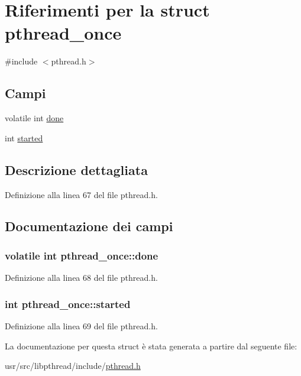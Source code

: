 \hypertarget{structpthread__once}{\section{Riferimenti per la struct pthread\+\_\+once}
\label{structpthread__once}
}


{\ttfamily \#include $<$pthread.\+h$>$}

\subsection*{Campi}
\begin{DoxyCompactItemize}
\item 
volatile int \hyperlink{structpthread__once_acffdc3852414e4eeece3c8e7cf80ffc1}{done}
\item 
int \hyperlink{structpthread__once_a2bebfebb49a5c75d10119824d5bba93c}{started}
\end{DoxyCompactItemize}


\subsection{Descrizione dettagliata}


Definizione alla linea 67 del file pthread.\+h.



\subsection{Documentazione dei campi}
\hypertarget{structpthread__once_acffdc3852414e4eeece3c8e7cf80ffc1}{
\subsubsection[{done}]{\setlength{\rightskip}{0pt plus 5cm}volatile int pthread\+\_\+once\+::done}}\label{structpthread__once_acffdc3852414e4eeece3c8e7cf80ffc1}


Definizione alla linea 68 del file pthread.\+h.

\hypertarget{structpthread__once_a2bebfebb49a5c75d10119824d5bba93c}{
\subsubsection[{started}]{\setlength{\rightskip}{0pt plus 5cm}int pthread\+\_\+once\+::started}}\label{structpthread__once_a2bebfebb49a5c75d10119824d5bba93c}


Definizione alla linea 69 del file pthread.\+h.



La documentazione per questa struct è stata generata a partire dal seguente file\+:\begin{DoxyCompactItemize}
\item 
usr/src/libpthread/include/\hyperlink{pthread_8h}{pthread.\+h}\end{DoxyCompactItemize}
